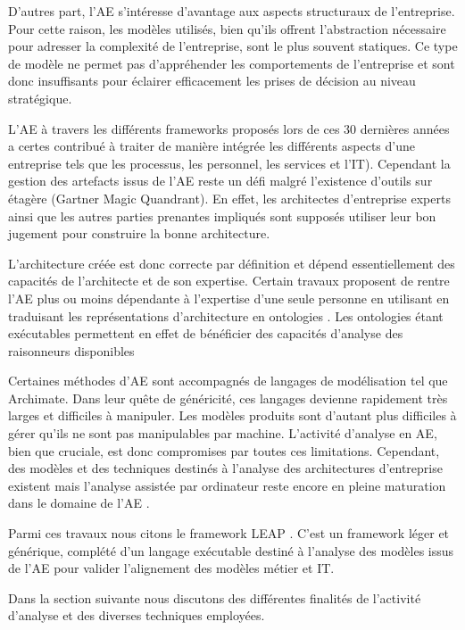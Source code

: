 D'autres part, l'AE s'intéresse d'avantage aux aspects structuraux de l'entreprise. Pour cette raison, les modèles utilisés, bien qu'ils offrent l'abstraction nécessaire pour adresser la complexité de l'entreprise, sont le plus souvent statiques. Ce type de modèle ne permet pas d'appréhender les comportements de l'entreprise et sont donc insuffisants pour éclairer efficacement les prises de décision au niveau stratégique.

L'AE à travers les différents frameworks proposés lors de ces 30 dernières années a certes contribué à traiter de manière intégrée les différents aspects d'une entreprise tels que les processus, les personnel, les services et l'IT). Cependant la gestion des artefacts issus de l'AE reste un défi \cite{zachman1997enterprise} malgré l'existence d'outils sur étagère (Gartner Magic Quandrant). En effet, les architectes d'entreprise experts ainsi que les autres parties prenantes impliqués sont supposés utiliser leur bon jugement pour construire la bonne architecture. 

L'architecture créée est donc correcte par définition et dépend essentiellement des capacités de l'architecte et de son expertise. Certain travaux proposent de rentre l'AE plus ou moins dépendante à l'expertise d'une seule personne en utilisant en traduisant les représentations d'architecture en ontologies \cite{sunkle_analyzing_2013}. Les ontologies étant exécutables permettent en effet de bénéficier des capacités d'analyse des raisonneurs disponibles 

Certaines méthodes d'AE sont accompagnés de langages de modélisation tel que Archimate. Dans leur quête de généricité, ces langages devienne rapidement très larges et difficiles à manipuler. Les modèles produits sont d'autant plus difficiles à gérer qu'ils ne sont pas manipulables par machine. L'activité d'analyse en AE, bien que cruciale, est donc compromises par toutes ces limitations. Cependant, des modèles et des techniques destinés à l'analyse des architectures d'entreprise existent mais l'analyse assistée par ordinateur reste encore en pleine maturation dans le domaine de l'AE \cite{kulkarni2013modelling}. 

Parmi ces travaux nous citons le framework LEAP \cite{clark2011leap}. C'est un framework léger et générique, complété d'un langage exécutable destiné à l'analyse des modèles issus de l'AE pour valider l'alignement des modèles métier et IT. 

Dans la section suivante nous discutons des différentes finalités de l'activité d'analyse et des diverses techniques employées.

